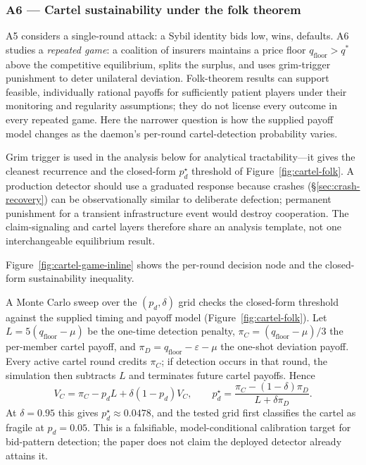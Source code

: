 \documentclass[11pt,a4paper]{article}
\theoremstyle{definition}
\theoremstyle{remark}
\begin{document}
\subsubsection{A6 --- Cartel sustainability under the folk theorem}\label{sec:youle:a6}

A5 considers a single-round attack: a Sybil identity bids low, wins, defaults. A6 studies a \emph{repeated game}: a coalition of insurers maintains a price floor $q_{\mathrm{floor}} > q^*$ above the competitive equilibrium, splits the surplus, and uses grim-trigger punishment to deter unilateral deviation. Folk-theorem results can support feasible, individually rational payoffs for sufficiently patient players under their monitoring and regularity assumptions; they do not license every outcome in every repeated game. Here the narrower question is how the supplied payoff model changes as the daemon's per-round cartel-detection probability varies.

Grim trigger is used in the analysis below for analytical tractability---it gives the cleanest recurrence and the closed-form $p_d^\star$ threshold of Figure~\ref{fig:cartel-folk}. A production detector should use a graduated response because crashes (\S\ref{sec:crash-recovery}) can be observationally similar to deliberate defection; permanent punishment for a transient infrastructure event would destroy cooperation. The claim-signaling and cartel layers therefore share an analysis template, not one interchangeable equilibrium result.

Figure~\ref{fig:cartel-game-inline} shows the per-round decision node and the closed-form sustainability inequality.



A Monte Carlo sweep over the $(p_d, \delta)$ grid checks the closed-form threshold against the supplied timing and payoff model (Figure~\ref{fig:cartel-folk}). Let $L=5(q_{\mathrm{floor}}-\mu)$ be the one-time detection penalty, $\pi_C=(q_{\mathrm{floor}}-\mu)/3$ the per-member cartel payoff, and $\pi_D=q_{\mathrm{floor}}-\varepsilon-\mu$ the one-shot deviation payoff. Every active cartel round credits $\pi_C$; if detection occurs in that round, the simulation then subtracts $L$ and terminates future cartel payoffs. Hence
\[
V_C=\pi_C-p_dL+\delta(1-p_d)V_C,
\qquad
p_d^\star=\frac{\pi_C-(1-\delta)\pi_D}{L+\delta\pi_D}.
\]
At $\delta=0.95$ this gives $p_d^\star\approx0.0478$, and the tested grid first classifies the cartel as fragile at $p_d=0.05$. This is a falsifiable, model-conditional calibration target for bid-pattern detection; the paper does not claim the deployed detector already attains it.
\end{document}
